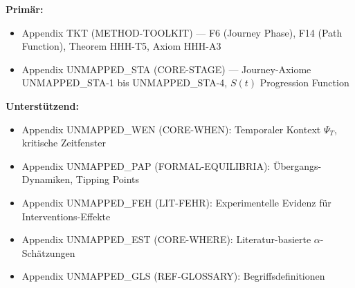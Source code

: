 \begin{tcolorbox}[colback=yellow!10!white, colframe=orange!75!black,
    title=Appendix References for This Chapter]

\textbf{Primär:}
\begin{itemize}[nosep]
\item Appendix TKT (METHOD-TOOLKIT) --- F6 (Journey Phase), F14 (Path Function), Theorem HHH-T5, Axiom HHH-A3
\item Appendix UNMAPPED_STA (CORE-STAGE) --- Journey-Axiome UNMAPPED_STA-1 bis UNMAPPED_STA-4, $S(t)$ Progression Function
\end{itemize}

\textbf{Unterstützend:}
\begin{itemize}[nosep]
\item Appendix UNMAPPED_WEN (CORE-WHEN): Temporaler Kontext $\Psi_T$, kritische Zeitfenster
\item Appendix UNMAPPED_PAP (FORMAL-EQUILIBRIA): Übergangs-Dynamiken, Tipping Points
\item Appendix UNMAPPED_FEH (LIT-FEHR): Experimentelle Evidenz für Interventions-Effekte
\item Appendix UNMAPPED_EST (CORE-WHERE): Literatur-basierte $\alpha$-Schätzungen
\item Appendix UNMAPPED_GLS (REF-GLOSSARY): Begriffsdefinitionen
\end{itemize}
\end{tcolorbox}


